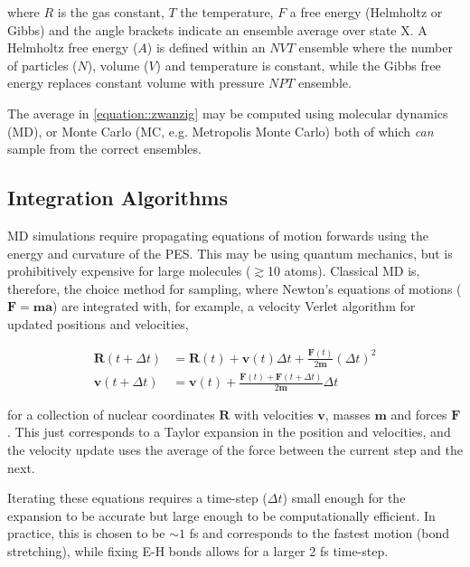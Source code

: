 \documentclass[main.tex]{subfiles}
\begin{document}
where $R$ is the gas constant, $T$ the temperature, $F$ a free energy (Helmholtz or Gibbs) and the angle brackets indicate an ensemble average over state X. A Helmholtz free energy ($A$) is defined within an $NVT$ ensemble where the number of particles ($N$), volume ($V$) and temperature is constant, while the Gibbs free energy replaces constant volume with pressure $NPT$ ensemble.

The average in \eqref{equation::zwanzig} may be computed using molecular dynamics (MD), or Monte Carlo (MC, e.g. Metropolis Monte Carlo) both of which \emph{can} sample from the correct ensembles.


\subsection{Integration Algorithms}

MD simulations require propagating equations of motion forwards using the energy and curvature of the PES. This may be using quantum mechanics, but is prohibitively expensive for large molecules ($\gtrsim$10 atoms).\cite{Zhang2016} Classical MD is, therefore, the choice method for sampling, where Newton's equations of motions ($\boldsymbol{F}=\boldsymbol{m}\boldsymbol{a}$) are integrated with, for example, a velocity Verlet algorithm for updated positions and velocities,


\begin{equation}
	\begin{aligned}
		\boldsymbol{R}(t+\Delta t) &= \boldsymbol{R}(t) + \boldsymbol{v}(t) \Delta t + \frac{\boldsymbol{F}(t) }{2 \boldsymbol{m}} (\Delta t)^2\\
		\boldsymbol{v}(t + \Delta t) &= \boldsymbol{v}(t)  + \frac{\boldsymbol{F}(t) + \boldsymbol{F}(t+\Delta t)}{2\boldsymbol{m}} \Delta t
	\end{aligned}
\end{equation}

for a collection of nuclear coordinates $\boldsymbol{R}$ with velocities $\boldsymbol{v}$, masses $\boldsymbol{m}$ and forces $\boldsymbol{F}$. This just corresponds to a Taylor expansion in the position and velocities, and the velocity update uses the average of the force between the current step and the next.

Iterating these equations requires a time-step ($\Delta t$) small enough for the expansion to be accurate but large enough to be computationally efficient. In practice, this is chosen to be $\sim 1$ fs and corresponds to the fastest motion (bond stretching), while fixing E-H bonds allows for a larger 2 fs time-step.\cite{Sweet2013}
\end{document}
